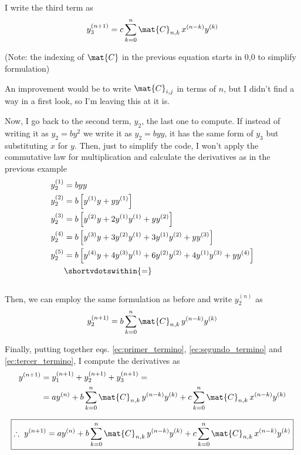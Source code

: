 \documentclass[12pt, a4paper]{article}
\begin{document}
I write the third term as
\begin{equation}\label{ec:tercer_termino}
    y_3^{(n+1)} = c \sum_{k=0}^{n} \mat{C}_{n,k}\, x^{(n-k)} y^{(k)}
\end{equation}

(Note: the indexing of $\mat{C}$ in the previous equation starts in 0,0 to simplify formulation)

An improvement would be to write $\mat{C}_{i,j}$ in terms of $n$, but I didn't find a way in a first look, so I'm leaving this at it is.

Now, I go back to the second term, $y_2$, the last one to compute. If instead of writing it as $y_2 = by^2$ we write it as $y_2 = byy$, it has the same form of $y_3$ but substituting $x$ for $y$. Then, just to simplify the code, I won't apply the commutative law for multiplication and calculate the derivatives as in the previous example
\begin{alignat*}{3}
    y_2^{(1)} &= b y y \\
    y_2^{(2)} &= b \left[ y^{(1)} y +   y y^{(1)}  \right] \\
    y_2^{(3)} &= b \left[ y^{(2)} y + 2 y^{(1)} y^{(1)} +   y y^{(2)}  \right] \\
    y_2^{(4)} &= b \left[ y^{(3)} y + 3 y^{(2)} y^{(1)} + 3 y^{(1)} y^{(2)} +   y y^{(3)} \right] \\
    y_2^{(5)} &= b \left[ y^{(4)} y + 4 y^{(3)} y^{(1)} + 6 y^{(2)} y^{(2)} + 4 y^{(1)} y^{(3)} + y y^{(4)} \right] \\
              &\shortvdotswithin{=} \notag
\end{alignat*} \\[-15mm]

Then, we can employ the same formulation as before and write $y_2^{(n)}$ as
\begin{equation}\label{ec:segundo_termino}
    y_2^{(n+1)} = b \sum_{k=0}^{n} \mat{C}_{n,k}\, y^{(n-k)} y^{(k)}
\end{equation}

Finally, putting together eqs. \eqref{ec:primer_termino}, \eqref{ec:segundo_termino} and \eqref{ec:tercer_termino}, I compute the derivatives as
\begin{align*}
    y^{(n+1)} &= y_1^{(n+1)} + y_2^{(n+1)} + y_3^{(n+1)} = \\
              &= a y^{(n)} + b \sum_{k=0}^{n} \mat{C}_{n,k}\, y^{(n-k)} y^{(k)} + c \sum_{k=0}^{n} \mat{C}_{n,k}\, x^{(n-k)} y^{(k)}
\end{align*}

\begin{equation}
    \boxed{
        \therefore\ y^{(n+1)} = a y^{(n)} + b \sum_{k=0}^{n} \mat{C}_{n,k}\, y^{(n-k)} y^{(k)} + c \sum_{k=0}^{n} \mat{C}_{n,k}\, x^{(n-k)} y^{(k)}
    }
\end{equation}
\end{document}
